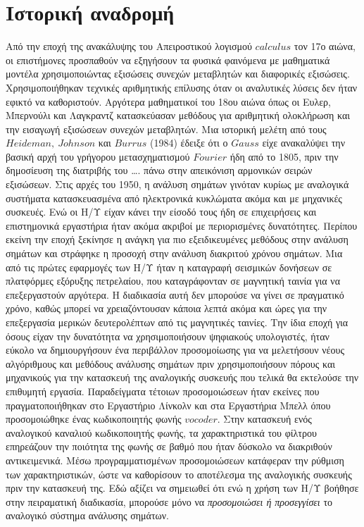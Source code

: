 \documentclass[breaklines=true, 12pt]{article}
\begin{document}
\section{Ιστορική αναδρομή}
\label{sec:org9541787}
Από την εποχή της ανακάλυψης του Απειροστικού λογισμού \(calculus\)
τον 17ο αιώνα, οι επιστήμονες προσπαθούν να εξηγήσουν τα φυσικά
φαινόμενα με μαθηματικά μοντέλα χρησιμοποιώντας εξισώσεις
συνεχών μεταβλητών και διαφορικές εξισώσεις. Χρησιμοποιήθηκαν
τεχνικές αριθμητικής επίλυσης όταν οι αναλυτικές λύσεις δεν
ήταν εφικτό να καθοριστούν. Αργότερα μαθηματικοί του 18ου αιώνα
όπως οι Ευλερ, Μπερνούλι και Λαγκραντζ κατασκεύασαν μεθόδους
για αριθμητική ολοκλήρωση και την εισαγωγή εξισώσεων συνεχών
μεταβλητών. Μια ιστορική μελέτη από τους \(Heideman,\ Johnson\) και
\({Burrus}\) (1984) έδειξε ότι ο \({Gauss}\) είχε ανακαλύψει την βασική
αρχή του γρήγορου μετασχηματισμού \({Fourier}\) ήδη από το 1805, πριν
την δημοσίευση της διατριβής του \ldots{}. πάνω στην απεικόνιση
αρμονικών σειρών εξισώσεων.
Στις αρχές του 1950, η ανάλυση σημάτων γινόταν κυρίως με
αναλογικά συστήματα κατασκευασμένα από ηλεκτρονικά κυκλώματα
ακόμα και με μηχανικές συσκευές. Ενώ οι Η/Υ είχαν κάνει την
είσοδό τους ήδη σε επιχειρήσεις και επιστημονικά εργαστήρια
ήταν ακόμα ακριβοί με περιορισμένες δυνατότητες. Περίπου εκείνη
την εποχή ξεκίνησε η ανάγκη για πιο εξειδικευμένες μεθόδους
στην ανάλυση σημάτων και στράφηκε η προσοχή στην ανάλυση
διακριτού χρόνου σημάτων. Μια από τις πρώτες εφαρμογές των Η/Υ
ήταν η καταγραφή σεισμικών δονήσεων σε πλατφόρμες εξόρυξης
πετρελαίου, που καταγράφονταν σε μαγνητική ταινία για να επεξεργαστούν
αργότερα. Η διαδικασία αυτή δεν μπορούσε να γίνει σε
πραγματικό χρόνο, καθώς μπορεί να χρειαζόντουσαν κάποια
λεπτά ακόμα και ώρες για την επεξεργασία μερικών δευτερολέπτων
από τις μαγνητικές ταινίες.
    Την ίδια εποχή για όσους είχαν την δυνατότητα να χρησιμοποιήσουν
ψηφιακούς υπολογιστές, ήταν εύκολο να δημιουργήσουν ένα περιβάλλον
προσομοίωσης για να μελετήσουν νέους αλγόριθμους και μεθόδους
ανάλυσης σημάτων πριν χρησιμοποιήσουν πόρους και μηχανικούς για την
κατασκευή της αναλογικής συσκευής που τελικά θα εκτελούσε την
επιθυμητή εργασία. Παραδείγματα τέτοιων προσομοιώσεων ήταν εκείνες
που πραγματοποιήθηκαν στο Εργαστήριο Λίνκολν και στα Εργαστήρια Μπελλ
όπου προσομοιώθηκε ένας κωδικοποιητής φωνής \({vocoder}\). Στην κατασκευή
ενός αναλογικού καναλιού κωδικοποιητής φωνής, τα χαρακτηριστικά του
φίλτρου επηρεάζουν την ποιότητα της φωνής σε βαθμό που ήταν δύσκολο να
διακριθούν αντικειμενικά. Μέσω προγραμματισμένων προσομοιώσεων
κατάφεραν την ρύθμιση των χαρακτηριστικών, ώστε να καθορίσουν το
αποτέλεσμα της αναλογικής συσκευής πριν την κατασκευή της.
    Εδώ αξίζει να σημειωθεί ότι ενώ η χρήση των Η/Υ βοήθησε στην πειραματική
διαδικασία, μπορούσε μόνο να \emph{προσομοιώσει ή προσεγγίσει} το αναλογικό
σύστημα ανάλυσης σημάτων.
\end{document}
